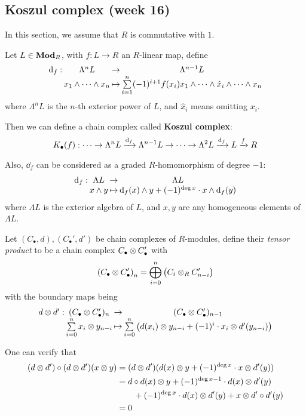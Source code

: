 \subsection{Koszul complex (week 16)}
In this section, we assume that $R$ is commutative with $1$.
\begin{definition}
  Let $L \in \mathbf{Mod}_R$, with $f: L \to R$ an $R$-linear map, define
  $$\deffunc{\dd_f}{\Lambda^n L}{\Lambda^{n-1} L}{x_1 \we \cdots \we x_n}
  {\sum\limits_{i=1}^n (-1)^{i+1} f(x_i) x_1 \we \cdots \we \hat{x}_i \we
  \cdots \we x_n}$$
  where $\Lambda^n L$ is the $n$-th exterior power of $L$, and $\hat{x}_i$ means
  omitting $x_i$.

  Then we can define a chain complex called {\bf Koszul complex}:
  $$K_\bullet(f) : \cdots \to \Lambda^n L \xrightarrow{\mathrm{d}_f} \Lambda^{n-1} L \to \cdots \to
  \Lambda^2 L \xrightarrow{\mathrm{d}_f} L \xrightarrow{f} R$$

  Also, $\dd_f$ can be considered as a graded $R$-homomorphism of degree $-1$:
  $$\deffunc{\dd_f}{\Lambda L}{\Lambda L}{x \we y}
  {\dd_f(x) \we y + (-1)^{\deg x}\cdot x \we \dd_f(y)}$$
  where $\Lambda L$ is the exterior algebra of $L$, and $x, y$ are any homogeneous 
  elements of $\Lambda L$.
\end{definition}

\begin{definition}
  Let $(C_\bullet, d), (C_\bullet', d')$ be chain complexes of $R$-modules, 
  define their {\it tensor product} to be a chain complex $C_\bullet \otimes C_\bullet'$ with
  $$\left( C_\bullet \otimes C_\bullet' \right)_n = 
  \bigoplus\limits_{i=0}^n \left( C_i \otimes_R C_{n-i}' \right)$$
  with the boundary maps being
  $$\deffunc{d \Ot d'}{(C_\bullet \Ot C_\bullet')_n}{(C_\bullet \Ot C_\bullet')_{n-1}}
  {\sum\limits_{i=0}^n x_i \Ot y_{n-i}}{\sum\limits_{i=0}^n 
  \left( d(x_i) \Ot y_{n-i} + (-1)^i \cdot x_i \Ot d'(y_{n-i}) \right)}$$

  One can verify that 
  \begin{align*}
    (d \otimes d') \circ (d \otimes d') (x \otimes y) 
    &= (d \otimes d') (d(x) \otimes y + (-1)^{\deg x} \cdot x \otimes d'(y)) \\
    &= d \circ d (x) \otimes y + (-1)^{\deg x - 1} \cdot d(x) \otimes d'(y) \\
    &\qquad + (-1)^{\deg x} \cdot d(x) \otimes d'(y) + x \otimes d' \circ d'(y) \\
    &= 0
  \end{align*}
\end{definition}

